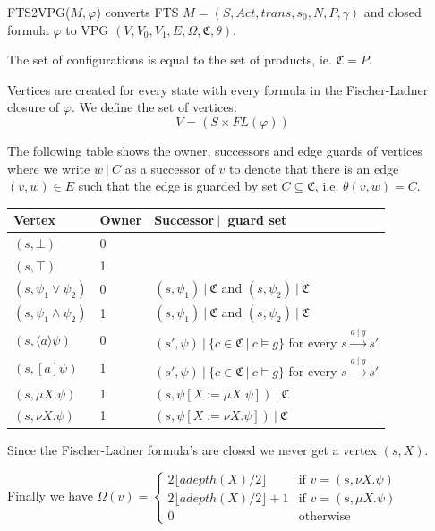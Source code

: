 \begin{definition}
	\label{def_FTS2VPG}
	FTS2VPG($M, \varphi$) converts FTS $M = (S, Act, trans, s_0, N, P, \gamma)$ and closed formula $\varphi$ to VPG $(V, V_0, V_1, E, \Omega, \mathfrak{C},\theta)$.
	
	The set of configurations is equal to the set of products, ie. $\mathfrak{C} = P$.
	
	Vertices are created for every state with every formula in the Fischer-Ladner closure of $\varphi$. We define the set of vertices:
	\[ V = (S \times \textit{FL}(\varphi))\]
	
	The following table shows the owner, successors and edge guards of vertices where we write $w\ |\ C$ as a successor of $v$ to denote that there is an edge $(v,w) \in E$ such that the edge is guarded by set $C \subseteq \mathfrak{C}$, i.e. $\theta(v,w) = C$. 
	\begin{center}
		\begin{tabular}{l|l|l}
			Vertex & Owner & Successor$\ |\ $ guard set \\\hline
			$(s,\bot)$ & 0     &        \\
			$(s,\top)$ & 1     &        \\
			$(s,\psi_1 \vee \psi_2)$ & 0       & $(s,\psi_1)\ |\ \mathfrak{C}$ and $(s,\psi_2)\ |\ \mathfrak{C}$ \\
			$(s,\psi_1 \wedge \psi_2)$ & 1       & $(s,\psi_1)\ |\ \mathfrak{C}$ and $(s,\psi_2)\ |\ \mathfrak{C}$ \\
			$(s, \langle a \rangle \psi)$ & 0 & $(s',\psi)\ |\ \{c \in \mathfrak{C}\ |\ c \models g\}$ for every $s \xrightarrow{ a\ |\ g} s'$\\
			$(s, [ a ] \psi)$ & 1 & $(s',\psi)\ |\ \{c \in \mathfrak{C}\ |\ c \models g\}$ for every $s \xrightarrow{ a\ |\ g} s'$\\
			$(s, \mu X. \psi)$ & 1 & $(s, \psi[X:= \mu X. \psi])\ |\ \mathfrak{C}$ \\
			$(s, \nu X. \psi)$ & 1 & $(s, \psi[X:= \nu X. \psi])\ |\ \mathfrak{C}$ 
		\end{tabular}
	\end{center}
	
	Since the Fischer-Ladner formula's are closed we never get a vertex $(s,X)$.
	
	Finally we have $\Omega(v) = \begin{cases}
	2 \lfloor adepth(X) / 2 \rfloor & \text{if } v = (s,\nu X. \psi)\\
	2 \lfloor adepth(X) / 2 \rfloor + 1 & \text{if } v = (s,\mu X. \psi)\\
	0 & \text{otherwise}
	\end{cases}$
\end{definition}
